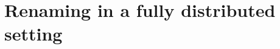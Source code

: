 \documentclass{article}
\theoremstyle{definition}
\begin{document}

\section{Renaming in a fully distributed setting}
\end{document}
